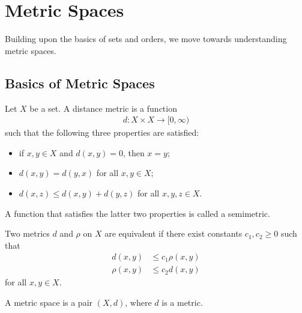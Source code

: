 \section{Metric Spaces}%
Building upon the basics of sets and orders, we move towards understanding metric spaces.
\subsection{Basics of Metric Spaces}%
\begin{definition}[Metrics]\label{def:metrics_and_equivalent_metrics}
  Let $X$ be a set. A distance metric is a function
  \begin{align*}
    d\colon X\times X\rightarrow [0,\infty)
  \end{align*}
  such that the following three properties are satisfied:
  \begin{itemize}
    \item if $x,y\in X$ and $d\left(x,y\right) = 0$, then $x = y$;
    \item $d\left(x,y\right) = d\left(y,x\right)$ for all $x,y\in X$;
    \item $d\left(x,z\right) \leq d\left(x,y\right) + d\left(y,z\right)$ for all $x,y,z\in X$.
  \end{itemize}
  A function that satisfies the latter two properties is called a semimetric.\newline

  Two metrics $d$ and $\rho$ on $X$ are equivalent if there exist constants $c_1,c_2\geq 0$ such that
  \begin{align*}
    d\left(x,y\right) &\leq c_1 \rho\left(x,y\right)\\
    \rho\left(x,y\right) &\leq c_2 d\left(x,y\right)
  \end{align*}
  for all $x,y\in X$.\newline

  A metric space is a pair $\left(X,d\right)$, where $d$ is a metric.
\end{definition}
